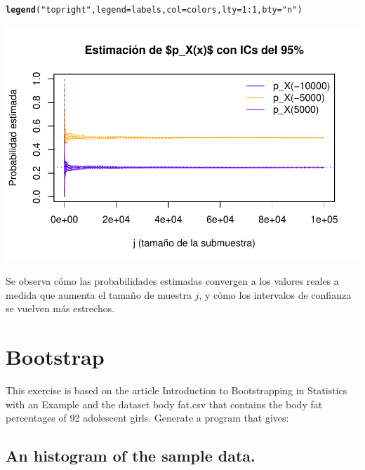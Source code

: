 \documentclass[12pt]{article}\usepackage[]{graphicx}\usepackage[]{xcolor}
\makeatletter
\def\maxwidth{ %
  \ifdim\Gin@nat@width>\linewidth
    \linewidth
  \else
    \Gin@nat@width
  \fi
}
\newcommand{\hlnum}[1]{\textcolor[rgb]{0.686,0.059,0.569}{#1}}%
\newcommand{\hlsng}[1]{\textcolor[rgb]{0.192,0.494,0.8}{#1}}%
\newcommand{\hlopt}[1]{\textcolor[rgb]{0,0,0}{#1}}%
\newcommand{\hldef}[1]{\textcolor[rgb]{0.345,0.345,0.345}{#1}}%
\newcommand{\hlkwc}[1]{\textcolor[rgb]{0.333,0.667,0.333}{#1}}%
\newcommand{\hlkwd}[1]{\textcolor[rgb]{0.737,0.353,0.396}{\textbf{#1}}}%
\newenvironment{kframe}{%
 \def\at@end@of@kframe{}%
 \ifinner\ifhmode%
  \def\at@end@of@kframe{\end{minipage}}%
  \begin{minipage}{\columnwidth}%
 \fi\fi%
 \def\FrameCommand##1{\hskip\@totalleftmargin \hskip-\fboxsep
 \colorbox{shadecolor}{##1}\hskip-\fboxsep
     \hskip-\linewidth \hskip-\@totalleftmargin \hskip\columnwidth}%
 \MakeFramed {\advance\hsize-\width
   \@totalleftmargin\z@ \linewidth\hsize
   \@setminipage}}%
 {\par\unskip\endMakeFramed%
 \at@end@of@kframe}
\newenvironment{knitrout}{}{} %
\makeatother
\begin{document}
\begin{knitrout}
\begin{kframe}
\begin{alltt}
\hlkwd{legend}\hldef{(}\hlsng{"topright"}\hldef{,} \hlkwc{legend} \hldef{= labels,} \hlkwc{col} \hldef{= colors,} \hlkwc{lty} \hldef{=} \hlnum{1}\hlopt{:}\hlnum{1}\hldef{,} \hlkwc{bty} \hldef{=} \hlsng{"n"}\hldef{)}
\end{alltt}
\end{kframe}
\includegraphics[width=\maxwidth]{figure/plot-probabilities-1} 
\end{knitrout}

Se observa cómo las probabilidades estimadas convergen a los valores reales a medida que aumenta el tamaño de muestra $j$, y cómo los intervalos de confianza se vuelven más estrechos.


\section{Bootstrap}

This exercise is based on the article Introduction to Bootstrapping in Statistics with an Example and the dataset body fat.csv that contains the body fat percentages of 92 adolescent girls. Generate a program that gives:

\subsection{An histogram of the sample data.}
\end{document}
